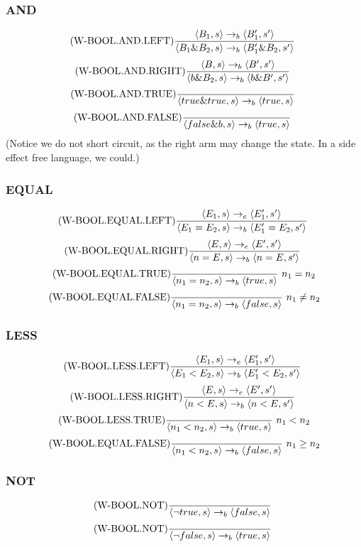 \documentclass{report}
\begin{document}
        \subsubsection*{AND}
            \[\text{(W-BOOL.AND.LEFT)}\dfrac{\langle B_1, s \rangle \to_b \langle B'_1, s' \rangle}{\langle B_1 \& B_2, s \rangle \to_b \langle B'_1 \& B_2, s' \rangle} \ \]
            \[\text{(W-BOOL.AND.RIGHT)}\dfrac{\langle B, s \rangle \to_b \langle B', s' \rangle}{\langle b \& B_2, s \rangle \to_b \langle b \& B', s' \rangle} \ \]
            \[\text{(W-BOOL.AND.TRUE)}\dfrac{}{\langle true \& true, s \rangle \to_b \langle true, s \rangle} \ \]
            \[\text{(W-BOOL.AND.FALSE)}\dfrac{}{\langle false \& b, s \rangle \to_b \langle true, s \rangle} \ \]
            (Notice we do not short circuit, as the right arm may change the state. In a side effect free language, we could.)
        \subsubsection*{EQUAL}
            \[\text{(W-BOOL.EQUAL.LEFT)}\dfrac{\langle E_1, s \rangle \to_e \langle E'_1, s' \rangle}{\langle E_1 = E_2, s \rangle \to_b \langle E'_1 = E_2, s' \rangle} \ \]
            \[\text{(W-BOOL.EQUAL.RIGHT)}\dfrac{\langle E, s \rangle \to_e \langle E', s' \rangle}{\langle n = E, s \rangle \to_b \langle n = E, s' \rangle} \ \]
            \[\text{(W-BOOL.EQUAL.TRUE)}\dfrac{}{\langle n_1 = n_2, s \rangle \to_b \langle true, s \rangle} \ n_1 = n_2\]
            \[\text{(W-BOOL.EQUAL.FALSE)}\dfrac{}{\langle n_1 = n_2, s \rangle \to_b \langle false, s \rangle} \ n_1 \neq n_2\]
        \subsubsection*{LESS}
            \[\text{(W-BOOL.LESS.LEFT)}\dfrac{\langle E_1, s \rangle \to_e \langle E'_1, s' \rangle}{\langle E_1 < E_2, s \rangle \to_b \langle E'_1 < E_2, s' \rangle} \ \]
            \[\text{(W-BOOL.LESS.RIGHT)}\dfrac{\langle E, s \rangle \to_e \langle E', s' \rangle}{\langle n < E, s \rangle \to_b \langle n < E, s' \rangle} \ \]
            \[\text{(W-BOOL.LESS.TRUE)}\dfrac{}{\langle n_1 < n_2, s \rangle \to_b \langle true, s \rangle} \ n_1 < n_2\]
            \[\text{(W-BOOL.EQUAL.FALSE)}\dfrac{}{\langle n_1 < n_2, s \rangle \to_b \langle false, s \rangle} \ n_1 \geq n_2\]
        \subsubsection*{NOT}
            \[\text{(W-BOOL.NOT)}\dfrac{}{\langle \neg true, s \rangle \to_b \langle false, s \rangle} \ \]
            \[\text{(W-BOOL.NOT)}\dfrac{}{\langle \neg false, s \rangle \to_b \langle true, s \rangle} \ \]
\end{document}
